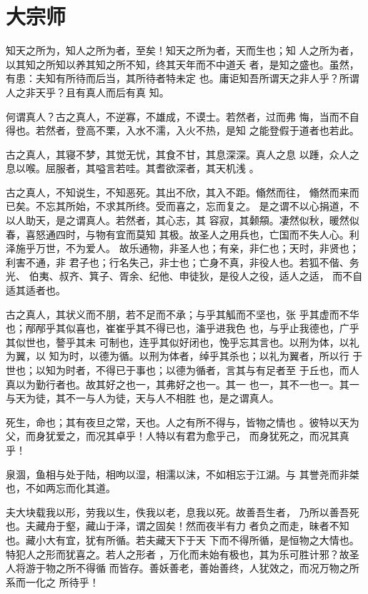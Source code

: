 \documentclass[a4paper,12pt,UTF8,twoside]{ctexbook}
\begin{document}
\section{大宗师}

知天之所为，知人之所为者，至矣！知天之所为者，天而生也；知 人之所为者，以其知之所知以养其知之所不知，终其天年而不中道夭 者，是知之盛也。虽然，有患：夫知有所待而后当，其所待者特未定 也。庸讵知吾所谓天之非人乎？所谓人之非天乎？且有真人而后有真 知。

何谓真人？古之真人，不逆寡，不雄成，不谟士。若然者，过而弗 悔，当而不自得也。若然者，登高不栗，入水不濡，入火不热，是知 之能登假于道者也若此。

古之真人，其寝不梦，其觉无忧，其食不甘，其息深深。真人之息 以踵，众人之息以喉。屈服者，其嗌言若哇。其耆欲深者，其天机浅 。

古之真人，不知说生，不知恶死。其出不欣，其入不距。翛然而往， 翛然而来而已矣。不忘其所始，不求其所终。受而喜之，忘而复之。 是之谓不以心捐道，不以人助天，是之谓真人。若然者，其心志，其 容寂，其颡頯。凄然似秋，暖然似春，喜怒通四时，与物有宜而莫知 其极。故圣人之用兵也，亡国而不失人心。利泽施乎万世，不为爱人。 故乐通物，非圣人也；有亲，非仁也；天时，非贤也；利害不通，非 君子也；行名失己，非士也；亡身不真，非役人也。若狐不偕、务光、 伯夷、叔齐、箕子、胥余、纪他、申徒狄，是役人之役，适人之适， 而不自适其适者也。

古之真人，其状义而不朋，若不足而不承；与乎其觚而不坚也，张 乎其虚而不华也；邴邴乎其似喜也，崔崔乎其不得已也，滀乎进我色 也，与乎止我德也，广乎其似世也，謷乎其未 可制也，连乎其似好闭也，悗乎忘其言也。以刑为体，以礼为翼，以 知为时，以德为循。以刑为体者，绰乎其杀也；以礼为翼者，所以行 于世也；以知为时者，不得已于事也；以德为循者，言其与有足者至 于丘也，而人真以为勤行者也。故其好之也一，其弗好之也一。其一 也一，其不一也一。其一与天为徒，其不一与人为徒，天与人不相胜 也，是之谓真人。

死生，命也；其有夜旦之常，天也。人之有所不得与，皆物之情也 。彼特以天为父，而身犹爱之，而况其卓乎！人特以有君为愈乎己， 而身犹死之，而况其真乎！

泉涸，鱼相与处于陆，相呴以湿，相濡以沫，不如相忘于江湖。与 其誉尧而非桀也，不如两忘而化其道。

夫大块载我以形，劳我以生，佚我以老，息我以死。故善吾生者， 乃所以善吾死也。夫藏舟于壑，藏山于泽，谓之固矣！然而夜半有力 者负之而走，昧者不知也。藏小大有宜，犹有所循。若夫藏天下于天 下而不得所循，是恒物之大情也。特犯人之形而犹喜之。若人之形者 ，万化而未始有极也，其为乐可胜计邪？故圣人将游于物之所不得循 而皆存。善妖善老，善始善终，人犹效之，而况万物之所系而一化之 所待乎！
\end{document}
